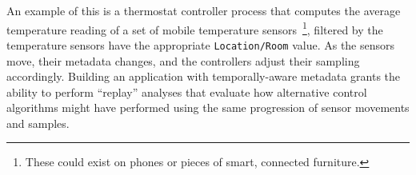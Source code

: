An example of this is a thermostat controller process that computes the
average temperature reading of a set of mobile temperature sensors~\footnote{These
could exist on phones or pieces of smart, connected furniture.}, filtered by
the temperature sensors have the appropriate \texttt{Location/Room} value. As
the sensors move, their metadata changes, and the controllers adjust their
sampling accordingly. Building an application with temporally-aware metadata
grants the ability to perform ``replay'' analyses that evaluate how
alternative control algorithms might have performed using the same progression
of sensor movements and samples.

